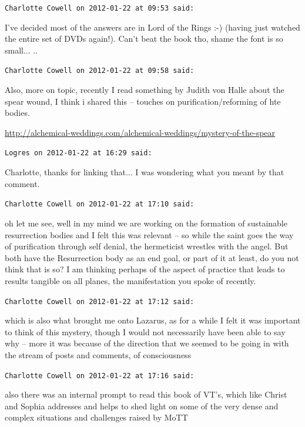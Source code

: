 \begin{footnotesize}
\begin{sffamily}
\hfill

\texttt{Charlotte Cowell on 2012-01-22 at 09:53 said:}

I've decided most of the answers are in Lord of the Rings :-) (having just watched the entire set of DVDs again!). Can't beat the book tho, shame the font is so small... ..

\hfill

\texttt{Charlotte Cowell on 2012-01-22 at 09:58 said:}

Also, more on topic, recently I read something by Judith von Halle about the spear wound, I think i shared this -- touches on purification/reforming of hte bodies.

\url{http://alchemical-weddings.com/alchemical-weddings/mystery-of-the-spear}


\hfill

\texttt{Logres on 2012-01-22 at 16:29 said:}

Charlotte, thanks for linking that... I was wondering what you meant by that comment.

\hfill

\texttt{Charlotte Cowell on 2012-01-22 at 17:10 said:}

oh let me see, well in my mind we are working on the formation of sustainable resurrection bodies and I felt this was relevant -- so while the saint goes the way of purification through self denial, the hermeticist wrestles with the angel. But both have the Resurrection body as an end goal, or part of it at least, do you not think that is so? I am thinking perhaps of the aspect of practice that leads to results tangible on all planes, the manifestation you spoke of recently.

\hfill

\texttt{Charlotte Cowell on 2012-01-22 at 17:12 said:}

which is also what brought me onto Lazarus, as for a while I felt it was important to think of this mystery, though I would not necessarily have been able to say why -- more it was because of the direction that we seemed to be going in with the stream of posts and comments, of consciousness

\hfill

\texttt{Charlotte Cowell on 2012-01-22 at 17:16 said:}

also there was an internal prompt to read this book of VT's, which like Christ and Sophia addresses and helps to shed light on some of the very dense and complex situations and challenges raised by MoTT


\end{sffamily}
\end{footnotesize}
